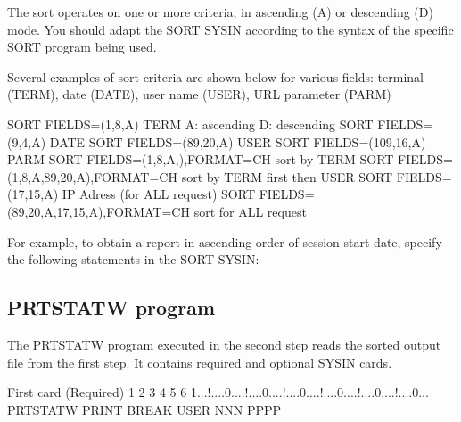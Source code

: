 \documentclass[letterpaper,10pt,english]{sphinxmanual}
\begin{document}
The sort operates on one or more criteria, in ascending (A) or descending (D) mode. You should adapt the SORT SYSIN according to the syntax of the specific SORT program being used.

Several examples of sort criteria are shown below for various fields: terminal (TERM), date (DATE), user name (USER), URL parameter (PARM)

\begin{sphinxVerbatim}[commandchars=\\\{\}]
SORT FIELDS=(1,8,A) \PYGZhy{}\PYGZhy{}\PYGZgt{} TERM A: ascending D: descending
SORT FIELDS=(9,4,A) \PYGZhy{}\PYGZhy{}\PYGZgt{} DATE
SORT FIELDS=(89,20,A) \PYGZhy{}\PYGZhy{}\PYGZgt{} USER
SORT FIELDS=(109,16,A) \PYGZhy{}\PYGZhy{}\PYGZgt{} PARM
SORT FIELDS=(1,8,A,),FORMAT=CH sort by TERM
SORT FIELDS=(1,8,A,89,20,A),FORMAT=CH sort by TERM first then USER
SORT FIELDS=(17,15,A) \PYGZhy{}\PYGZhy{}\PYGZgt{} IP Adress (for \PYGZdl{}ALL\PYGZdl{} request)
SORT FIELDS=(89,20,A,17,15,A),FORMAT=CH sort for \PYGZdl{}ALL\PYGZdl{} request
\end{sphinxVerbatim}


\newpage

For example, to obtain a report in ascending order of session start date, specify the following statements in the SORT SYSIN:

\begin{sphinxVerbatim}[commandchars=\\\{\}]
  
 
\end{sphinxVerbatim}


\subsection{PRTSTATW program}
\label{\detokenize{audit_operations_ and_performance:index-89}}\label{\detokenize{audit_operations_ and_performance:prtstatw-program}}
The PRTSTATW program executed in the second step reads the sorted output file from the first step. It contains required and optional SYSIN cards.

\begin{sphinxVerbatim}[commandchars=\\\{\}]
First card (Required)
         1         2         3         4         5         6
1...!....0....!....0....!....0....!....0....!....0....!....0...
PRTSTATW PRINT                BREAK USER          NNN  PPPP
\end{sphinxVerbatim}
\end{document}
